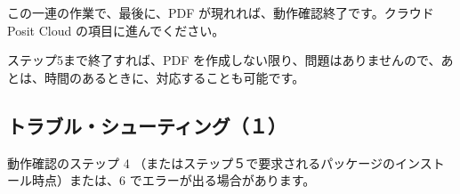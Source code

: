 \documentclass[
  xelatex, ja=standard]{bxjsbook}
\theoremstyle{definition}
\theoremstyle{definition}
\theoremstyle{definition}
\theoremstyle{definition}
\theoremstyle{remark}
\begin{document}
この一連の作業で、最後に、PDF が現れれば、動作確認終了です。クラウド Posit Cloud の項目に進んでください。

ステップ5まで終了すれば、PDF を作成しない限り、問題はありませんので、あとは、時間のあるときに、対応することも可能です。

\hypertarget{ux30c8ux30e9ux30d6ux30ebux30b7ux30e5ux30fcux30c6ux30a3ux30f3ux30b0uxff11}{%
\subsection{トラブル・シューティング（１）}\label{ux30c8ux30e9ux30d6ux30ebux30b7ux30e5ux30fcux30c6ux30a3ux30f3ux30b0uxff11}}

動作確認のステップ 4 （またはステップ５で要求されるパッケージのインストール時点）または、6 でエラーが出る場合があります。
\end{document}
